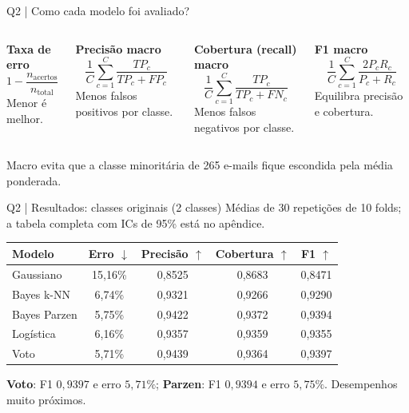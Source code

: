 \documentclass[aspectratio=169,11pt]{beamer}
\begin{document}
\begin{frame}[t]{Q2 | Como cada modelo foi avaliado?}

\begin{columns}[T,onlytextwidth]
\begin{simplebox}\small \textbf{Taxa de erro}\\[2mm]
\[\textstyle 1-\frac{n_{\mathrm{acertos}}}{n_{\mathrm{total}}}\]
\scriptsize Menor é melhor.
\end{simplebox}
\begin{simplebox}\small \textbf{Precisão macro}\\[1mm]
\[\textstyle \frac{1}{C}\sum_{c=1}^{C}\frac{TP_c}{TP_c+FP_c}\]
\scriptsize Menos falsos positivos por classe.
\end{simplebox}
\begin{simplebox}\small \textbf{Cobertura (recall) macro}\\[1mm]
\[\textstyle \frac{1}{C}\sum_{c=1}^{C}\frac{TP_c}{TP_c+FN_c}\]
\scriptsize Menos falsos negativos por classe.
\end{simplebox}
\begin{simplebox}\small \textbf{F1 macro}\\[1mm]
\[\textstyle \frac{1}{C}\sum_{c=1}^{C}\frac{2P_cR_c}{P_c+R_c}\]
\scriptsize Equilibra precisão e cobertura.
\end{simplebox}
\end{columns}
\vspace{1mm}\scriptsize Macro evita que a classe minoritária de 265 e-mails fique escondida pela média ponderada.

\end{frame}

\begin{frame}[t]{Q2 | Resultados: classes originais (2 classes)}
\small Médias de 30 repetições de 10 folds; a tabela completa com ICs de 95\% está no apêndice.\vspace{2mm}
\par
\small
\renewcommand{\arraystretch}{1.3}
\setlength{\tabcolsep}{4pt}
\centering
\begin{tabular}{lcccc}
\toprule
Modelo & Erro $\downarrow$ & Precisão $\uparrow$ & Cobertura $\uparrow$ & F1 $\uparrow$ \\
\midrule
Gaussiano & 15,16\% & 0,8525 & 0,8683 & 0,8471 \\
Bayes k-NN & 6,74\% & 0,9321 & 0,9266 & 0,9290 \\
Bayes Parzen & 5,75\% & 0,9422 & 0,9372 & 0,9394 \\
Logística & 6,16\% & 0,9357 & 0,9359 & 0,9355 \\
Voto & 5,71\% & 0,9439 & 0,9364 & 0,9397 \\
\bottomrule
\end{tabular}
\par\vspace{3mm}
\begin{notabox}\small \textbf{Voto}: F1 $0,9397$ e erro $5,71\%$; \textbf{Parzen}: F1 $0,9394$ e erro $5,75\%$. Desempenhos muito próximos.\end{notabox}
\end{frame}
\end{document}
